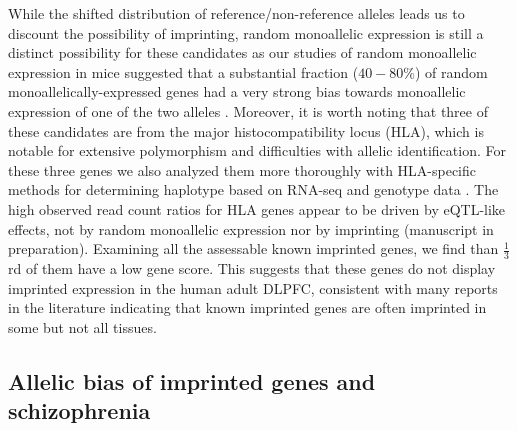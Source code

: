 \documentclass[letterpaper]{article}
\begin{document}
While the shifted distribution of reference/non-reference alleles leads us to
discount the possibility of imprinting, random monoallelic expression is still
a distinct possibility for these candidates as our studies of random
monoallelic expression in mice suggested that a substantial fraction
(\(40-80\%\)) of random monoallelically-expressed genes had a very strong bias
towards monoallelic expression of one of the two alleles \cite{Zwemer2012}.
Moreover, it is worth noting that three of these candidates are from the major
histocompatibility locus (HLA), which is notable for extensive polymorphism
and difficulties with allelic identification. For these three genes we also
analyzed them more thoroughly with HLA-specific methods for determining
haplotype based on RNA-seq \cite{Bai2014a} and genotype data \cite{Zheng2014}.
The high observed read count ratios for HLA genes appear to be driven by
eQTL-like effects, not by random monoallelic expression nor by imprinting
(manuscript in preparation).  Examining all the assessable known imprinted
genes, we find than \(\frac{1}{3}\)rd of them have a low gene score. This
suggests that these genes do not display imprinted expression in the human
adult DLPFC, consistent with many reports in the literature indicating that
known imprinted genes are often imprinted in some but not all tissues.  

\subsection{Allelic bias of imprinted genes and schizophrenia}
\label{sec:results-regression}
\end{document}
